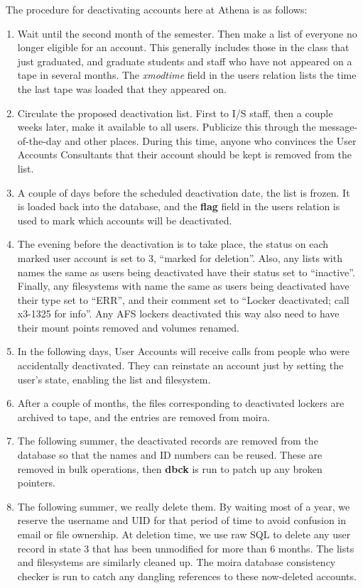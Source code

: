\athena\ The procedure for deactivating accounts here at Athena is as
follows:
\begin{enumerate}
\item Wait until the second month of the semester.  Then make a list
of everyone no longer eligible for an account.  This generally
includes those in the class that just graduated, and graduate students
and staff who have not appeared on a tape in several months.  The {\em
xmodtime} field in the users relation lists the time the last tape was
loaded that they appeared on.
\item Circulate the proposed deactivation list.  First to I/S staff,
then a couple weeks later, make it available to all users.  Publicize
this through the message-of-the-day and other places.  During this
time, anyone who convinces the User Accounts Consultants that their
account should be kept is removed from the list.
\item A couple of days before the scheduled deactivation date, the
list is frozen.  It is loaded back into the database, and the {\bf
flag} field in the users relation is used to mark which accounts will
be deactivated.
\item The evening before the deactivation is to take place, the status
on each marked user account is set to 3, ``marked for deletion''.
Also, any lists with names the same as users being deactivated have
their status set to ``inactive''.  Finally, any filesystems with name
the same as users being deactivated have their type set to ``ERR'',
and their comment set to ``Locker deactivated; call x3-1325 for info''.
Any AFS lockers deactivated this way also need to have their mount
points removed and volumes renamed.
\item In the following days, User Accounts will receive calls from
people who were accidentally deactivated.  They can reinstate an
account just by setting the user's state, enabling the list and
filesystem.
\item After a couple of months, the files corresponding to deactivated
lockers are archived to tape, and the entries are removed from moira.
\item The following summer, the deactivated records are removed from
the database so that the names and ID numbers can be reused.  These
are removed in bulk operations, then {\bf dbck} is run to patch up any
broken pointers.
\item The following summer, we really delete them.  By waiting most of a
year, we reserve the username and UID for that period of time to avoid
confusion in email or file ownership.  At deletion time, we use raw
SQL to delete any user record in state 3 that has been unmodified for
more than 6 months.  The lists and filesystems are similarly cleaned
up.  The moira database consistency checker is run to catch any
dangling references to these now-deleted accounts.
\end{enumerate}

